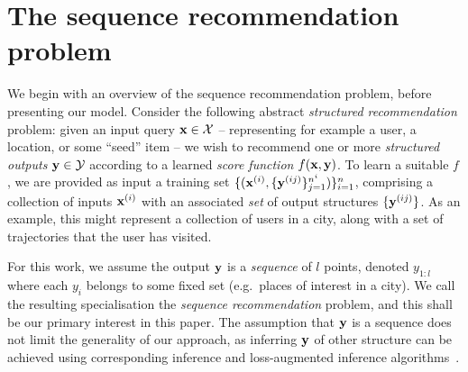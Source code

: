 \section{The sequence recommendation problem}
\label{sec:recseq}

We begin with an overview of the sequence recommendation problem, before presenting our model.
Consider the following abstract
\emph{structured recommendation} problem:
given an input query $\mathbf{x} \in \mathcal{X}$ -- representing for example a user, a location, or some ``seed'' item --
we wish to recommend one or more \emph{structured outputs} $\mathbf{y} \in \mathcal{Y}$ according to a learned \emph{score function} $f(\mathbf{x},\mathbf{y})$.
To learn a suitable $f$,
we are provided as input a training set
$\{ ( \mathbf{x}^{({i})}, \{ \mathbf{y}^{({ij})} \}_{j=1}^{n^i} ) \}_{i=1}^{n}$,
comprising a collection of inputs $\mathbf{x}^{({i})}$ with an associated \emph{set} of output structures $\{ \mathbf{y}^{({ij})} \}$.
As an example, this might represent a collection of users in a city, along with a set of trajectories that the user has visited.

For this work, we assume the output $\mathbf{y}$ is a \emph{sequence} of $l$ points, denoted $y_{1:l}$
where each $y_i$ belongs to some fixed set (e.g.\ places of interest in a city).
We call the resulting specialisation the \emph{sequence recommendation} problem,
and this shall be our primary interest in this paper.
The assumption that $\mathbf{y}$ is a sequence does not limit the generality of our approach,
as inferring $\mathbf{y}$ of other structure can be achieved using corresponding inference and loss-augmented inference algorithms~\cite{joachims2009predicting}.  %

